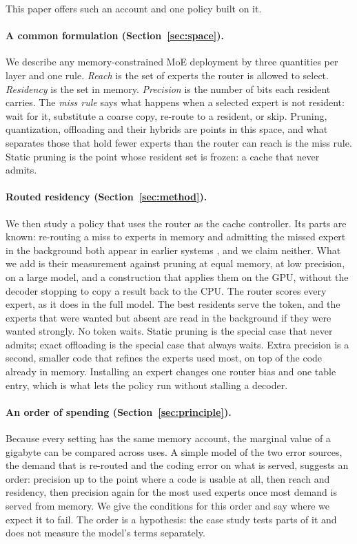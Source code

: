 \documentclass[11pt]{article}
\begin{document}
This paper offers such an account and one policy built on it.

\paragraph{A common formulation (Section~\ref{sec:space}).} We describe any memory-constrained
MoE deployment by three quantities per layer and one rule. \emph{Reach} is the set of experts
the router is allowed to select. \emph{Residency} is the set in memory. \emph{Precision} is the
number of bits each resident carries. The \emph{miss rule} says what happens when a selected
expert is not resident: wait for it, substitute a coarse copy, re-route to a resident, or skip.
Pruning, quantization, offloading and their hybrids are points in this space, and what
separates those that hold fewer experts than the router can reach is the miss rule. Static pruning is the point whose resident set is
frozen: a cache that never admits.

\paragraph{Routed residency (Section~\ref{sec:method}).} We then study a policy that uses
the router as the cache controller. Its parts are known: re-routing a miss to experts in memory and admitting the missed expert in the background both appear in earlier systems \citep{kong2023swapmoe,luo2026lightmoe,son2026misses}, and we claim neither. What we add is their measurement against pruning at equal memory, at low precision, on a large model, and a construction that applies them on the GPU, without the decoder stopping to copy a result back to the CPU. The router scores every expert, as it does in the full
model. The best residents serve the token, and the experts that were wanted but absent are
read in the background if they were wanted strongly. No token waits. Static pruning is the
special case that never admits; exact offloading is the special case that always waits.
Extra precision is a second, smaller code that refines the experts used most, on top of the code already in memory. Installing an expert changes one router bias and one table entry, which is what lets the policy run without stalling a decoder.

\paragraph{An order of spending (Section~\ref{sec:principle}).} Because every setting has the
same memory account, the marginal value of a gigabyte can be compared across uses. A simple
model of the two error sources, the demand that is re-routed and the coding error on what is
served, suggests an order: precision up to the point where a code is usable at all, then reach
and residency, then precision again for the most used experts once most demand is served from
memory. We give the conditions for this order and say where we expect it to fail. The order is a hypothesis: the case study tests parts of it and does not measure the model's terms separately.
\end{document}
